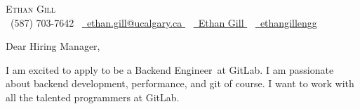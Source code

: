 
\newcommand{\userName}{Ethan Gill}
\newcommand{\userFullName}{Ethan Gill}
\newcommand{\userPhone}{(587) 703-7642}
\newcommand{\userEmail}{ethan.gill@ucalgary.ca}
\newcommand{\userGithub}{ethangillengg}
\newcommand{\userLinkedIn}{https://www.linkedin.com/in/ethan-gill-008a00258/}
\newcommand{\currentUniversity}{the University of Calgary's Schulich School of Engineering}
\newcommand{\companyName}{GitLab}
\newcommand{\jobTitle}{Backend Engineer}
\newcommand{\introTopics}{backend development, performance, and git of course}
\newcommand{\whyMePersonalized}{More recently I have taken to “Git-ifying” my life as much as possible. I use it for my notes, resume (in LaTeX), projects, etc. I believe Git is an extremely powerful tool that has so many different use cases. I would be ecstatic to learn Git in even more depth at \companyName.

	\par
	During my coding journey, I have had the wonderful opportunity to work on multiple internships, each with their own unique technical challenges. At my current position, I have been working on developing solutions in Vue.js for clients. Due to this prior experience with Vue.js, I will be able to hit the ground running at \companyName’s frontend team.
}



\begin{center}
	{\Huge \scshape \userFullName} \\
	\small \raisebox{-0.1\height}\faPhone\ \userPhone ~
	\href{mailto:\userEmail}{
		\raisebox{-0.2\height}\faEnvelope\  \underline{\userEmail}
	} ~
	\href{\userLinkedIn}{
		\raisebox{-0.2\height}\faLinkedin\ \underline{\userName}
	} ~
	\href{https://github.com/\userGithub}{
		\raisebox{-0.2\height}\faGithub\ \underline{\userGithub}
	}
\end{center}

\vspace{8pt}

\noindent{}\Large{Dear Hiring Manager,}

\par{}

I am excited to apply to be a \jobTitle~at \companyName. I am passionate about \introTopics. I want to work with all the talented programmers at \companyName.

